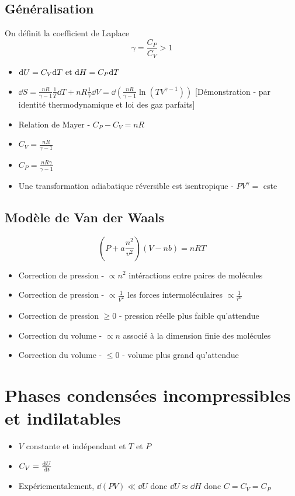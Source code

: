 \documentclass[openany]{book}
\begin{document}
\subsection{Généralisation}
On définit la coefficient de Laplace
\[ \gamma = \frac{C_P}{C_V} > 1 \]

\begin{itemize}
    \item $\text{d} U = C_V \text{d} T \text{ et } \text{d} H = C_P \text{d} T$
    \item $\dd S = \frac{nR}{\gamma - 1} \frac{1}{T} \dd T + nR \frac{1}{V} \dd V = \dd (\frac{nR}{\gamma - 1} \ln(TV^{\gamma -1}))$ [Démonstration - par identité thermodynamique et loi des gaz parfaits]
    \item Relation de Mayer - $C_P - C_V = nR$
    \item $C_V = \frac{nR}{\gamma - 1}$
    \item $C_P = \frac{nR\gamma}{\gamma - 1}$
    \item Une transformation adiabatique réversible est isentropique - $PV^{\gamma} = $ cste 
\end{itemize}

\subsection{Modèle de Van der Waals}
\[ (P + a \frac{n^2}{v^2})(V- nb) = nRT \]

\begin{itemize}
    \item Correction de pression - $\propto n^2$ intéractions entre paires de molécules
    \item Correction de pression - $\propto \frac{1}{V^2}$ les forces intermoléculaires $\propto \frac{1}{r^6}$
    \item Correction de pression $\geq 0$ - pression réelle plus faible qu'attendue
    \item Correction du volume - $\propto n$ associé à la dimension finie des molécules
    \item Correction du volume - $\leq 0$ - volume plus grand qu'attendue
\end{itemize}

\section{Phases condensées incompressibles et indilatables}
\begin{itemize}
    \item $V$ constante et indépendant et $T$ et $P$
    \item $C_V = \frac{\text{d} U}{\text{d}t}$
    \item Expériementalement, $\dd (PV) \ll \dd U$ donc $\dd U \approx \dd H$ donc $C = C_V = C_P$
\end{itemize}
\end{document}
